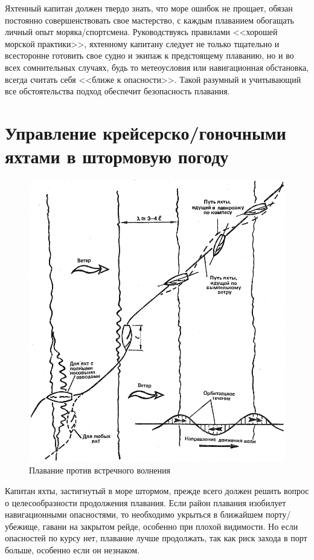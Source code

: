 \documentclass[a4paper, 12pt, twoside, final, book, russian, fittopage, cyremdash]{ncc}
\begin{document}
Яхтенный капитан должен твердо знать, что море ошибок не прощает, обязан постоянно совершенствовать свое мастерство, с каждым плаванием обогащать личный опыт моряка\-/спортсмена. Руководствуясь правилами <<хорошей морской практики>>, яхтенному капитану следует не только тщательно и всесторонне готовить свое судно и экипаж к предстоящему плаванию, но и во всех сомнительных случаях, будь то метеоусловия или навигационная обстановка, всегда считать себя <<ближе к опасности>>. Такой разумный и учитывающий все обстоятельства подход обеспечит безопасность плавания.

\section{Управление крейсерско\-/гоночными яхтами в штормовую погоду}

\begin{figure}[htb]
  \centering{}
  \includegraphics[scale=1.3]{0128P}
  \caption{Плавание против встречного волнения}
  \label{fig:128}
\end{figure}

Капитан яхты, застигнутый в море штормом, прежде всего должен решить вопрос о целесообразности продолжения плавания. Если район плавания изобилует навигационными опасностями, то необходимо укрыться в ближайшем порту\-/убежище, гавани на закрытом рейде, особенно при плохой видимости. Но если опасностей по курсу нет, плавание лучше продолжать, так как риск захода в порт больше, особенно если он незнаком.
\end{document}
